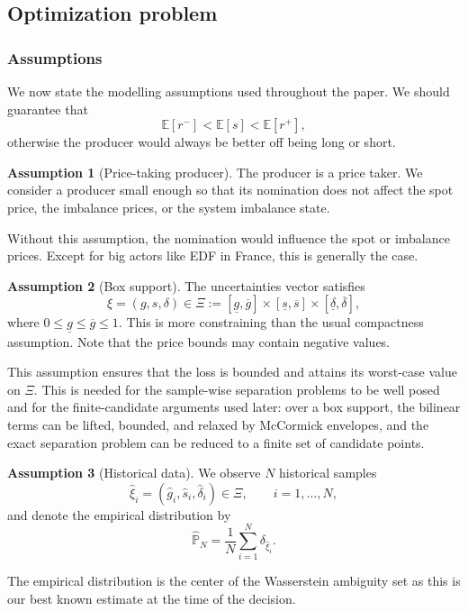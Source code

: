 \documentclass[11pt]{article}
\newcommand{\XiSet}{\Xi}
\newcommand{\hxi}{\widehat\xi}
\newcommand{\hP}{\widehat{\mathbb P}_N}
\theoremstyle{plain}
\theoremstyle{definition}
\newtheorem{assumption}{Assumption}
\begin{document}
\subsection{Optimization problem} 
\label{subsec:optimization-problem} 

\subsubsection{Assumptions}

We now state the modelling assumptions used throughout the paper. 
\color{red}
We should guarantee that
\begin{equation}
    \mathbb{E}[r^-] < \mathbb{E}[s] < \mathbb{E}[r^+],
\end{equation}
otherwise the producer would always be better off being long or short. 
\color{black}
\begin{assumption}[Price-taking producer] 
    \label{ass:price-taker} The producer is a price taker. 
    We consider a producer small enough so that its nomination does not affect the spot price, the imbalance prices, or the system imbalance state. 
\end{assumption}
Without this assumption, the nomination would influence the spot or imbalance prices.
Except for big actors like EDF in France, this is generally the case.

\begin{assumption}[Box support] 
    \label{ass:compact-support} 
    The uncertainties vector satisfies \[ \xi=(g,s,\delta)\in\XiSet := [\underline g,\overline g] \times [\underline s,\overline s] \times [\underline\delta,\overline\delta], \] where $0\le \underline g\le \overline g\le1$. 
    This is more constraining than the usual compactness assumption.
    Note that the price bounds may contain negative values. 
\end{assumption} 
This assumption ensures that the loss is bounded and attains its worst-case value on $\XiSet$. 
This is needed for the sample-wise separation problems to be well posed and for the finite-candidate arguments used later: over a box support, the bilinear terms can be lifted, bounded, and relaxed by McCormick envelopes, and the exact separation problem can be reduced to a finite set of candidate points. 

\begin{assumption}[Historical data] 
    \label{ass:data} 
    We observe $N$ historical samples \[ \hxi_i=(\widehat g_i,\widehat s_i,\widehat\delta_i)\in\XiSet, \qquad i=1,\ldots,N, \] and denote the empirical distribution by \[ \hP=\frac1N\sum_{i=1}^N\delta_{\hxi_i}. \] 
\end{assumption} 
The empirical distribution is the center of the Wasserstein ambiguity set as this is our best known estimate at the time of the decision. 
\end{document}
